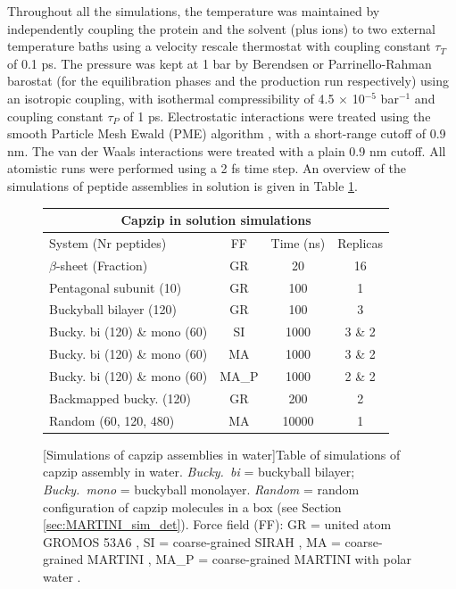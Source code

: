 Throughout all the simulations, the temperature was maintained by independently coupling the protein and the solvent (plus ions) to two external temperature baths using a velocity rescale thermostat \citep{Bussi2007} with coupling constant $\tau _T$ of 0.1 ps. The pressure was kept at 1 bar by Berendsen \citep{Berendsen1984} or Parrinello-Rahman barostat \citep{Parrinello1981} (for the equilibration phases and the production run respectively) using an isotropic coupling, with isothermal compressibility of 4.5 $\times$ 10$^{-5}$ bar$^{-1}$ and coupling constant $\tau_P$ of 1 ps. Electrostatic interactions were treated using the smooth Particle Mesh Ewald (PME) algorithm \citep{Essmann1995}, with a short-range cutoff of 0.9 nm. The van der Waals interactions were treated with a plain 0.9 nm cutoff. All atomistic runs were performed using a 2 fs time step. An overview of the simulations of peptide assemblies in solution is given in Table \ref{table:sim_solution}.

\begin{figure}[t]
\centering
 \def\arraystretch{1.6}
\begin{tabular}{l|ccc}
 \multicolumn{4}{c}{\textbf{Capzip in solution simulations}} \\
 \hline
 System (Nr peptides) & FF & Time (ns) & Replicas \\
 \hline
 $\beta$-sheet (Fraction) & GR & 20 & 16 \\
 Pentagonal subunit (10) & GR & 100 & 1 \\
 Buckyball bilayer (120) & GR & 100 & 3 \\
 Bucky. bi (120) \& mono (60) & SI & 1000 & 3 \& 2 \\
 Bucky. bi (120) \& mono (60) & MA & 1000 & 3 \& 2 \\
 Bucky. bi (120) \& mono (60) & MA\_P & 1000 & 2 \& 2 \\
 Backmapped bucky. (120) & GR & 200 & 2 \\
 Random (60, 120, 480) & MA & 10000 & 1 \\
 \hline
 \end{tabular}
[Simulations of capzip assemblies in water]{Table of simulations of capzip assembly in water. \emph{Bucky.\ bi} = buckyball bilayer; \emph{Bucky.\ mono} = buckyball monolayer. \emph{Random} = random configuration of capzip molecules in a box (see Section \ref{sec:MARTINI_sim_det}). Force field (FF): GR = united atom GROMOS 53A6 \citep{Oostenbrink2004}, SI = coarse-grained SIRAH \citep{Machado2018}, MA = coarse-grained MARTINI \citep{Marrink2007, Monticelli2008}, MA\_P = coarse-grained MARTINI with polar water \citep{Yesylevskyy2010}.}
\label{table:sim_solution}
\end{figure}

